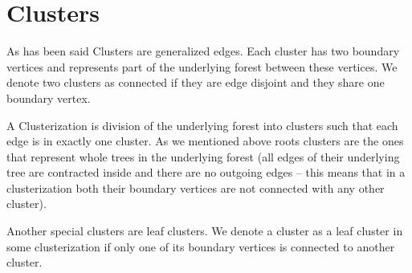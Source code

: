 \section{Clusters}

As has been said {\I Clusters} are generalized edges. Each cluster has two
{\I boundary vertices} and represents part of the underlying forest between
these vertices. We denote two clusters as {\I connected} if they are edge
disjoint and they share one boundary vertex.

A {\I Clusterization} is division of the underlying forest into clusters such
that each edge is in exactly one cluster. As we mentioned above {\I roots
clusters} are the ones that represent whole trees in the underlying forest
(all edges of their underlying tree are contracted inside and there are no
outgoing edges -- this means that in a clusterization both their boundary
vertices are not connected with any other cluster).

Another special clusters are {\I leaf clusters}. We denote a cluster as a
{\I leaf cluster} in some clusterization if only one of its boundary vertices is
connected to another cluster.

